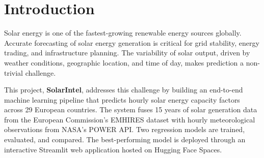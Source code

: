 \documentclass[12pt, a4paper]{article}
\begin{document}
\begin{abstract}
\noindent
Accurate forecasting of solar energy generation is essential for grid balancing, energy market operations, and renewable infrastructure planning across Europe. This report presents \textbf{SolarIntel}, an end-to-end machine learning system that predicts hourly solar capacity factors for 29 European countries by fusing 15 years of photovoltaic generation data from the European Commission's EMHIRES dataset with satellite-derived meteorological observations from NASA's POWER API. The resulting dataset comprises approximately 3.8 million hourly records and 34 features. Two regression models are trained and evaluated: a Linear Regression baseline ($R^2 = 0.788$) and a Random Forest Regressor ($R^2 = 0.911$). The superior model is deployed through an interactive Streamlit web application hosted on Hugging Face Spaces, enabling real-time prediction, 24-hour generation profiling, and cross-country comparison. Building on this ML foundation, Phase~2 introduces an Agentic AI Grid Advisor: a LangGraph-based multi-agent pipeline that fetches live weather forecasts, performs deterministic risk analysis, retrieves expert knowledge via Retrieval-Augmented Generation (RAG), and generates structured LLM recommendations tailored to grid operators and transmission system planners.
\end{abstract}

\clearpage
{}

\section{Introduction}

Solar energy is one of the fastest-growing renewable energy sources globally. Accurate forecasting of solar energy generation is critical for grid stability, energy trading, and infrastructure planning. The variability of solar output, driven by weather conditions, geographic location, and time of day, makes prediction a non-trivial challenge.

This project, \textbf{SolarIntel}, addresses this challenge by building an end-to-end machine learning pipeline that predicts hourly solar energy capacity factors across 29 European countries. The system fuses 15 years of solar generation data from the European Commission's EMHIRES dataset with hourly meteorological observations from NASA's POWER API. Two regression models are trained, evaluated, and compared. The best-performing model is deployed through an interactive Streamlit web application hosted on Hugging Face Spaces.
\end{document}
